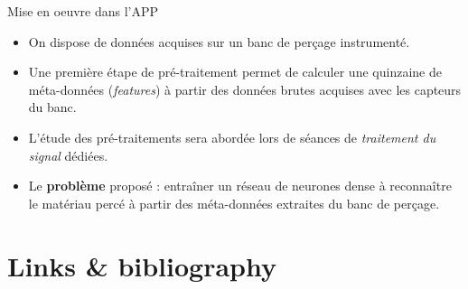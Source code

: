\documentclass[10pt,serif,mathserif,compress,hyperref={colorlinks}]{beamer}
\begin{document}
\begin{frame}{Mise en oeuvre dans l'APP}

  \begin{tcolorbox}[title=2 -- Résolution d'un problème de classification]
    \begin{itemize}
    \item On dispose de données acquises sur un banc de perçage instrumenté.
    \item Une première étape de pré-traitement permet de calculer une quinzaine de
      méta-données ({\em features}) à partir des données brutes acquises avec les capteurs du banc.
    \item L'étude des pré-traitements sera abordée lors de séances de {\em traitement du signal} dédiées.
    \item Le \textbf{problème} proposé : entraîner un réseau de neurones dense à reconnaître le matériau percé
      à partir des méta-données extraites du banc de perçage.
    \end{itemize}
      
  \end{tcolorbox}

\end{frame}

\section{Links \& bibliography}
\end{document}
